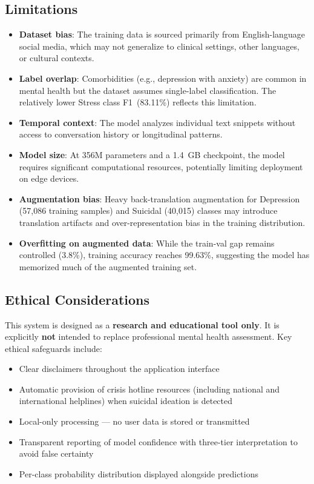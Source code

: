 \documentclass[conference, 10pt]{IEEEtran}
\begin{document}
\subsection{Limitations}

\begin{itemize}[noitemsep]
    \item \textbf{Dataset bias}: The training data is sourced primarily from English-language social media, which may not generalize to clinical settings, other languages, or cultural contexts.
    \item \textbf{Label overlap}: Comorbidities (e.g., depression with anxiety) are common in mental health but the dataset assumes single-label classification. The relatively lower Stress class F1~(83.11\%) reflects this limitation.
    \item \textbf{Temporal context}: The model analyzes individual text snippets without access to conversation history or longitudinal patterns.
    \item \textbf{Model size}: At 356M parameters and a 1.4~GB checkpoint, the model requires significant computational resources, potentially limiting deployment on edge devices.
    \item \textbf{Augmentation bias}: Heavy back-translation augmentation for Depression (57,086 training samples) and Suicidal (40,015) classes may introduce translation artifacts and over-representation bias in the training distribution.
    \item \textbf{Overfitting on augmented data}: While the train-val gap remains controlled (3.8\%), training accuracy reaches 99.63\%, suggesting the model has memorized much of the augmented training set.
\end{itemize}

\subsection{Ethical Considerations}

This system is designed as a \textbf{research and educational tool only}. It is explicitly \textbf{not} intended to replace professional mental health assessment. Key ethical safeguards include:

\begin{itemize}[noitemsep]
    \item Clear disclaimers throughout the application interface
    \item Automatic provision of crisis hotline resources (including national and international helplines) when suicidal ideation is detected
    \item Local-only processing — no user data is stored or transmitted
    \item Transparent reporting of model confidence with three-tier interpretation to avoid false certainty
    \item Per-class probability distribution displayed alongside predictions
\end{itemize}
\end{document}
